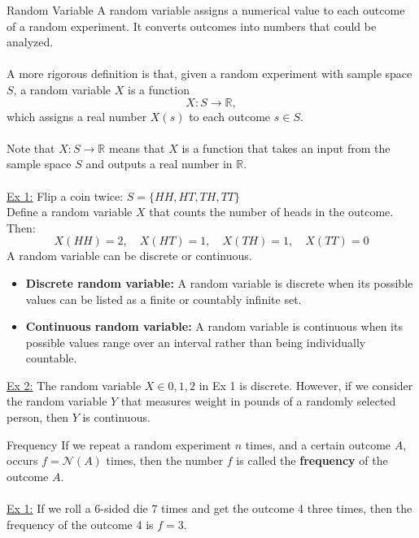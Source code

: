 ﻿\documentclass[12pt]{article}
\begin{document}
\begin{definition}{Random Variable}
A random variable assigns a numerical value to each outcome of a random experiment. It converts outcomes into numbers that could be analyzed.\\\\
A more rigorous definition is that, given a random experiment with sample space $S$, a random variable $X$ is a function
\[
X:S\to\mathbb{R},
\]
which assigns a real number $X(s)$ to each outcome $s\in S$.\\\\
Note that $X:S\to\mathbb{R}$ means that $X$ is a function that takes an input from the sample space $S$ and outputs a real number in $\mathbb{R}$.\\\\
\underline{Ex 1:} Flip a coin twice: $S = \{HH, HT, TH, TT\}$\\
Define a random variable $X$ that counts the number of heads in the outcome. Then:
\[X(HH) =2, \quad X(HT) =1, \quad X(TH) =1, \quad X(TT) =0\]
A random variable can be discrete or continuous.
\begin{itemize}
    \item \textbf{Discrete random variable:} A random variable is discrete when its possible values can be listed as a finite or countably infinite set.
    \item \textbf{Continuous random variable:} A random variable is continuous when its possible values range over an interval rather than being individually countable.
\end{itemize}
\vspace{1em}
\underline{Ex 2:} The random variable $X\in{0,1,2}$ in Ex 1 is discrete. However, if we consider the random variable $Y$ that measures weight in pounds of a randomly selected person, then $Y$ is continuous.
\end{definition}


\begin{definition}{Frequency}
    If we repeat a random experiment $n$ times, and a certain outcome $A$, occurs $f=\mathcal{N}(A)$ times, then the number $f$ is called the \textbf{frequency} of the outcome $A$. \\\\
    \underline{Ex 1:} If we roll a 6-sided die 7 times and get the outcome 4 three times, then the frequency of the outcome 4 is $f=3$.
\end{definition}
\end{document}
